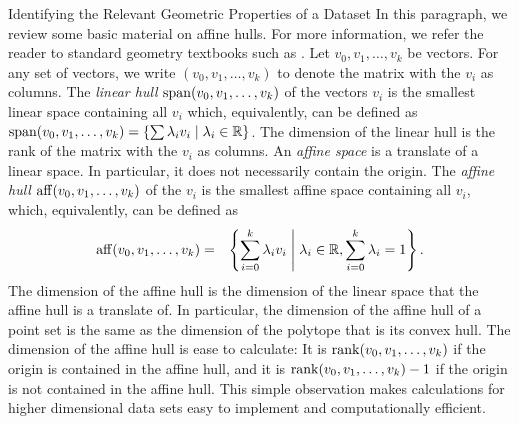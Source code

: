 \documentclass{llncs}
\begin{document}
\begin{section}{Identifying the Relevant Geometric Properties of a Dataset}
In this paragraph, we review some basic material on affine hulls. For more information, we refer the reader to standard geometry textbooks such as \cite{webster,Ziegler1995}. Let $v_0,v_1,\dots, v_k$ be vectors. For any set of vectors, we write $(v_0,v_1,\dots,v_k)$ to denote the matrix with the $v_i$ as columns. The {\em linear hull} $\operatorname{span}(v_0,v_1,\dots,v_k)$ of the vectors $v_i$ is the smallest linear space  containing all $v_i$ which, equivalently, can be defined as $\operatorname{span}(v_0,v_1,\dots,v_k) = \left\{ \sum \lambda_iv_i \;\middle| \; \lambda_i \in \mathbb{R} \right\}$.
The dimension of the linear hull is the rank of the matrix with the $v_i$ as columns. An {\em affine space} is a translate of a linear space. In particular, it does not necessarily contain the origin. The {\em affine hull} $\operatorname{aff}(v_0,v_1,\dots,v_k)$ of the $v_i$ is the smallest affine space containing all $v_i$, which, equivalently, can be defined as
\begin{eqnarray*}
\operatorname{aff}(v_0,v_1,\dots,v_k) &=& \left\{ \sum_{i=0}^k\lambda_iv_i \;\middle| \; \lambda_i\in \mathbb{R}, \sum_{i=0}^k\lambda_i = 1 \right\}.
\end{eqnarray*}
The dimension of the affine hull is the dimension of the linear space that the affine hull is a translate of. In particular, the dimension of the affine hull of a point set is the same as the dimension of the polytope that is its convex hull. The dimension of the affine hull is ease to calculate: It is $\operatorname{rank}(v_0,v_1,\dots,v_k)$ if the origin is contained in the affine hull, and it is $\operatorname{rank}(v_0,v_1,\dots,v_k)-1$ if the origin is not contained in the affine hull. This simple observation makes calculations for higher dimensional data sets easy to implement and computationally efficient.


\end{section}
\end{document}
